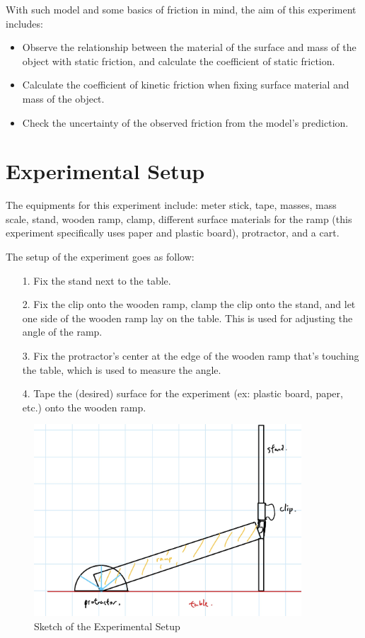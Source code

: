 \documentclass{article}
\begin{document}
\hfil

With such model and some basics of friction in mind, the aim of this experiment includes:
\begin{itemize}
    \item Observe the relationship between the material of the surface and mass of the object with static friction, and calculate the coefficient of static friction.
    \item Calculate the coefficient of kinetic friction when fixing surface material and mass of the object.
    \item Check the uncertainty of the observed friction from the model's prediction.
\end{itemize}

\pagebreak

\section{Experimental Setup}
The equipments for this experiment include: meter stick, tape, masses, mass scale, stand, wooden ramp, clamp, different surface materials for the ramp (this experiment specifically uses paper and plastic board), protractor, and a cart.

\hfil

The setup of the experiment goes as follow:
\begin{itemize}
    \item[1.] Fix the stand next to the table.
    \item[2.] Fix the clip onto the wooden ramp, clamp the clip onto the stand, and let one side of the wooden ramp lay on the table. This is used for adjusting the angle of the ramp.
    \item[3.] Fix the protractor's center at the edge of the wooden ramp that's touching the table, which is used to measure the angle.
    \item[4.] Tape the (desired) surface for the experiment (ex: plastic board, paper, etc.) onto the wooden ramp.
\end{itemize}

\begin{figure}[h!]
    \centering
    \includegraphics[width=100mm]{setup_sketch.jpg}
    \caption{Sketch of the Experimental Setup}
    \label{fig:sketch_setup}
\end{figure}
\end{document}
